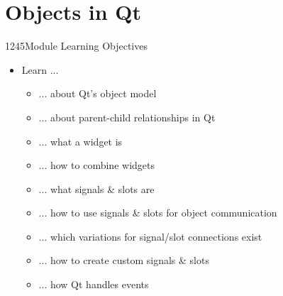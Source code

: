 \section{Objects in Qt}

\begin{slide}{1245}{Module Learning Objectives}
\begin{itemize}
\item Learn ...
  \begin{itemize}
  \item ... about Qt's object model
  \item ... about parent-child relationships in Qt
  \item ... what a widget is
  \item ... how to combine widgets
  \item ... what signals \& slots are
  \item ... how to use signals \& slots for object communication
  \item ... which variations for signal/slot connections exist
  \item ... how to create custom signals \& slots
  \item ... how Qt handles events
  \end{itemize}
\end{itemize}

\end{slide}










% 
